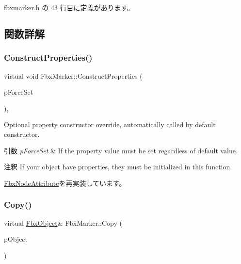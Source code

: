  fbxmarker.\+h の 43 行目に定義があります。



\subsection{関数詳解}
\mbox{\label{class_fbx_marker_a02a9ec30c7dc256cce288e2f9961b507}} 
\subsubsection{\texorpdfstring{Construct\+Properties()}{ConstructProperties()}}
{\footnotesize\ttfamily virtual void Fbx\+Marker\+::\+Construct\+Properties (\begin{DoxyParamCaption}\item[{bool}]{p\+Force\+Set }\end{DoxyParamCaption})\hspace{0.3cm}{\ttfamily [protected]}, {\ttfamily [virtual]}}

Optional property constructor override, automatically called by default constructor. 
\begin{DoxyParams}{引数}
{\em p\+Force\+Set} & If the property value must be set regardless of default value. \\
\hline
\end{DoxyParams}
\begin{DoxyRemark}{注釈}
If your object have properties, they must be initialized in this function. 
\end{DoxyRemark}


\hyperlink{class_fbx_node_attribute_a042eb9949a9b9634dcc5f126e82fd04a}{Fbx\+Node\+Attribute}を再実装しています。

\mbox{\label{class_fbx_marker_a935603050774e09ec8b3d2a5200bbbc7}} 
\subsubsection{\texorpdfstring{Copy()}{Copy()}}
{\footnotesize\ttfamily virtual \hyperlink{class_fbx_object}{Fbx\+Object}\& Fbx\+Marker\+::\+Copy (\begin{DoxyParamCaption}\item[{const \hyperlink{class_fbx_object}{Fbx\+Object} \&}]{p\+Object }\end{DoxyParamCaption})\hspace{0.3cm}{\ttfamily [virtual]}}

